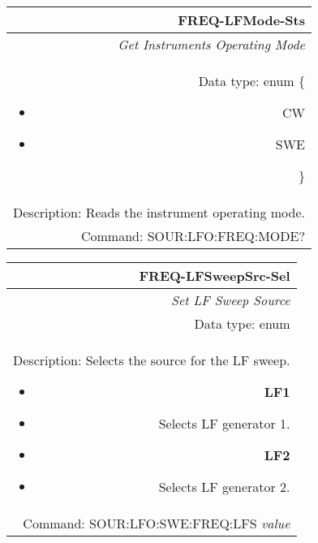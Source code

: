 \documentclass[openany]{article}
\begin{document}
		\begin{tabular}{N}
			\hline
			\bfseries FREQ-LFMode-Sts \\ \hline
			\emph{Get Instruments Operating Mode} \\
			Data type: enum \{\begin{itemize}[noitemsep]
				\small
				\item[] CW
				\item[] SWE
			\end{itemize}\} \\ 
			Description: Reads the instrument operating mode. \\
			Command: SOUR:LFO:FREQ:MODE? \\

		\end{tabular}
%
		\begin{tabular}{N}
			\hline
			\bfseries FREQ-LFSweepSrc-Sel \\ \hline
			\emph{Set LF Sweep Source} \\
			Data type: enum \\
			Description: Selects the source for the LF sweep.\begin{itemize}[noitemsep]
				\small
				\item[] \textbf{LF1} 
				\item[] Selects LF generator 1.
				\item[] \textbf{LF2}
				\item[] Selects LF generator 2.
			\end{itemize} \\
			Command: SOUR:LFO:SWE:FREQ:LFS \emph{value} \\

		\end{tabular}
\end{document}
